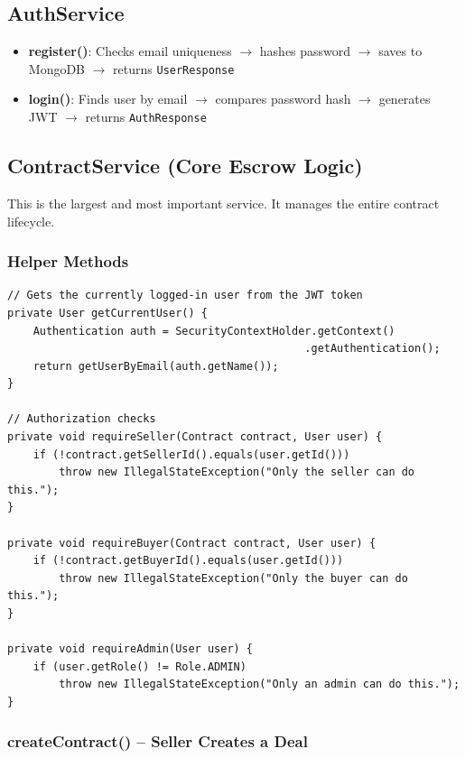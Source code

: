 \documentclass[11pt, a4paper]{article}
\begin{document}
\subsection{AuthService}

\begin{itemize}
    \item \textbf{register()}: Checks email uniqueness $\rightarrow$ hashes password $\rightarrow$ saves to MongoDB $\rightarrow$ returns \texttt{UserResponse}
    \item \textbf{login()}: Finds user by email $\rightarrow$ compares password hash $\rightarrow$ generates JWT $\rightarrow$ returns \texttt{AuthResponse}
\end{itemize}

\subsection{ContractService (Core Escrow Logic)}

This is the largest and most important service. It manages the entire contract lifecycle.

\subsubsection{Helper Methods}

\begin{lstlisting}[caption={ContractService.java -- Authorization Helpers}]
// Gets the currently logged-in user from the JWT token
private User getCurrentUser() {
    Authentication auth = SecurityContextHolder.getContext()
                                              .getAuthentication();
    return getUserByEmail(auth.getName());
}

// Authorization checks
private void requireSeller(Contract contract, User user) {
    if (!contract.getSellerId().equals(user.getId()))
        throw new IllegalStateException("Only the seller can do this.");
}

private void requireBuyer(Contract contract, User user) {
    if (!contract.getBuyerId().equals(user.getId()))
        throw new IllegalStateException("Only the buyer can do this.");
}

private void requireAdmin(User user) {
    if (user.getRole() != Role.ADMIN)
        throw new IllegalStateException("Only an admin can do this.");
}
\end{lstlisting}

\subsubsection{createContract() -- Seller Creates a Deal}
\end{document}
